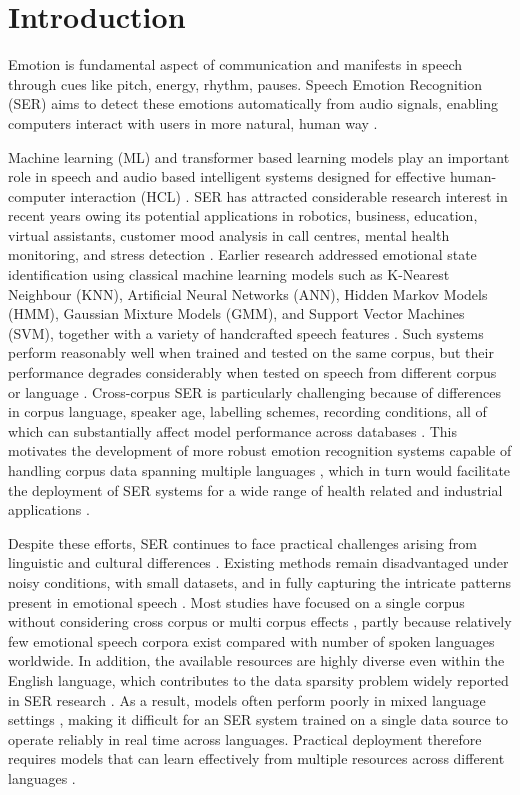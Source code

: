 \documentclass[runningheads]{llncs}
\begin{document}
\section{Introduction}

Emotion is fundamental aspect of communication and manifests in speech through cues like pitch, energy, rhythm, pauses. Speech Emotion Recognition (SER) aims to detect these emotions automatically from audio signals, enabling computers interact with users in more natural, human way \cite{b1,b2}.

Machine learning (ML) and transformer based learning models play an important role in speech and audio based intelligent systems designed for effective human-computer interaction (HCL) \cite{b16,b17}. SER has attracted considerable research interest in recent years owing its potential applications in robotics, business, education, virtual assistants, customer mood analysis in call centres, mental health monitoring, and stress detection \cite{b17}. Earlier research addressed emotional state identification using classical machine learning models such as K-Nearest Neighbour (KNN), Artificial Neural Networks (ANN), Hidden Markov Models (HMM), Gaussian Mixture Models (GMM), and Support Vector Machines (SVM), together with a variety of handcrafted speech features \cite{b9,b15}. Such systems perform reasonably well when trained and tested on the same corpus, but their performance degrades considerably when tested on speech from different corpus or language \cite{b7,b9}. Cross-corpus SER is particularly challenging because of differences in corpus language, speaker age, labelling schemes, recording conditions, all of which can substantially affect model performance across databases \cite{b7,b9}. This motivates the development of more robust emotion recognition systems capable of handling corpus data spanning multiple languages \cite{b4,b14}, which in turn would facilitate the deployment of SER systems for a wide range of health related and industrial applications \cite{b17}.

Despite these efforts, SER continues to face practical challenges arising from linguistic and cultural differences \cite{b1,b3}. Existing methods remain disadvantaged under noisy conditions, with small datasets, and in fully capturing the intricate patterns present in emotional speech \cite{b23}. Most studies have focused on a single corpus without considering cross corpus or multi corpus effects \cite{b9,b13}, partly because relatively few emotional speech corpora exist compared with number of spoken languages worldwide. In addition, the available resources are highly diverse even within the English language, which contributes to the data sparsity problem widely reported in SER research \cite{b4,b12}. As a result, models often perform poorly in mixed language settings \cite{b7,b8}, making it difficult for an SER system trained on a single data source to operate reliably in real time across languages. Practical deployment therefore requires models that can learn effectively from multiple resources across different languages \cite{b3,b4}.
\end{document}
